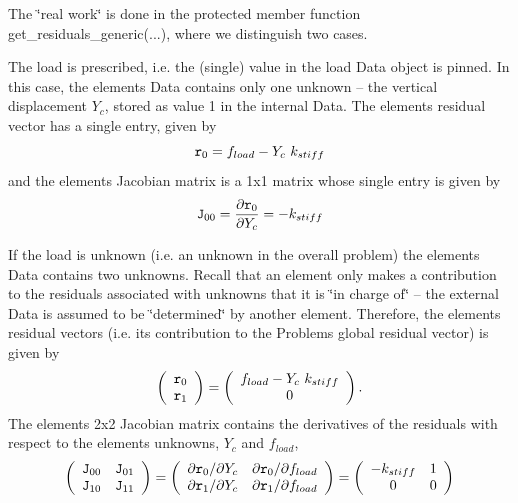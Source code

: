 The \char`\"{}real work\char`\"{} is done in the protected member function {\ttfamily get\+\_\+residuals\+\_\+generic}(...), where we distinguish two cases.
\begin{DoxyEnumerate}
\item The load is prescribed, i.\+e. the (single) value in the load {\ttfamily Data} object is pinned. In this case, the element\textquotesingle{}s {\ttfamily Data} contains only one unknown -- the vertical displacement $ Y_c $, stored as value 1 in the internal {\ttfamily Data}. The element\textquotesingle{}s residual vector has a single entry, given by \[ {\tt r}_0 = f_{load} - Y_c \ k_{stiff} \] and the element\textquotesingle{}s Jacobian matrix is a 1x1 matrix whose single entry is given by \[ {\tt J}_{00} = \frac{\partial {\tt r}_0}{\partial Y_c} = - k_{stiff} \]
\item If the load is unknown (i.\+e. an unknown in the overall problem) the element\textquotesingle{}s {\ttfamily Data} contains two unknowns. Recall that an element only makes a contribution to the residuals associated with unknowns that it is \char`\"{}in charge of\char`\"{} -- the external {\ttfamily Data} is assumed to be \char`\"{}determined\char`\"{} by another element. Therefore, the elements residual vectors (i.\+e. its contribution to the {\ttfamily Problem\textquotesingle{}s} global residual vector) is given by \[ \left( \begin{array}{c} {\tt r}_0 \\ {\tt r}_1 \end{array} \right) = \left( \begin{array}{c} f_{load} - Y_c \ k_{stiff}\\ 0 \end{array} \right). \] The element\textquotesingle{}s 2x2 Jacobian matrix contains the derivatives of the residuals with respect to the element\textquotesingle{}s unknowns, $ Y_c $ and $ f_{load}$, \[ \left( \begin{array}{cc} {\tt J}_{00} & {\tt J}_{01} \\ {\tt J}_{10} & {\tt J}_{11} \end{array} \right) = \left( \begin{array}{cc} \partial {\tt r}_0 / \partial Y_c& \partial {\tt r}_0 / \partial f_{load} \\ \partial {\tt r}_1 / \partial Y_c & \partial {\tt r}_1 / \partial f_{load} \end{array} \right) = \left( \begin{array}{cc} - k_{stiff} & 1 \\ 0 & 0 \end{array} \right) \]

\end{DoxyEnumerate}
